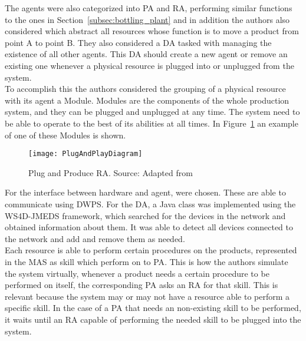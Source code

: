 The agents were also categorized into \acrshort{PA} and \acrshort{RA}, performing similar functions to the ones in Section~\ref{subsec:bottling_plant} and in addition the authors also considered  which abstract all resources whose function is to move a product from point A to point B. They also considered a \acrfull{DA} tasked with managing the existence of all other agents. This \acrshort{DA} should create a new agent or remove an existing one whenever a physical resource is plugged into or unplugged from the system.\\

To accomplish this the authors considered the grouping of a physical resource with its agent a Module. Modules are the components of the whole production system, and they can be plugged and unplugged at any time. The system need to be able to operate to the best of its abilities at all times. In Figure~\ref{fig:plug_and_play_device_architecture} an example of one of these Modules is shown.\\

\begin{figure}[h!]
	\centering
	\texttt{[image: PlugAndPlayDiagram]}
	\caption{Plug and Produce \acrshort{RA}. Source: Adapted from \cite{8972169}}
	\label{fig:plug_and_play_device_architecture}
\end{figure}

For the interface between hardware and agent,  were chosen. These  are able to communicate using \acrfull{DWPS}. For the \acrshort{DA}, a Java class was implemented using the \acrfull{WS4D-JMEDS} framework, which searched for the devices in the network and obtained information about them. It was able to detect all devices connected to the network and add and remove them as needed.\\

Each resource is able to perform certain procedures on the products, represented in the \acrshort{MAS} as skill which  perform on to \acrshort{PA}. This is how the authors simulate the system virtually, whenever a product needs a certain procedure to be performed on itself, the corresponding \acrshort{PA} asks an \acrshort{RA} for that skill. This is relevant because the system may or may not have a resource able to perform a specific skill. In the case of a \acrshort{PA} that needs an non-existing skill to be performed, it waits until an \acrshort{RA} capable of performing the needed skill to be plugged into the system.\\

